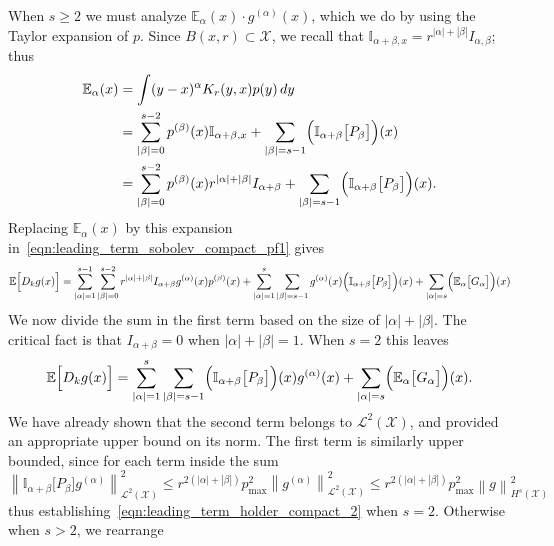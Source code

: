 \documentclass{article}
\newcommand{\abs}[1]{\left \lvert #1 \right \rvert}
\newcommand{\norm}[1]{\left \lVert #1 \right \rVert}
\newcommand{\1}{\mathbf{1}}
\newcommand{\Xset}{\mathcal{X}}
\newcommand{\Leb}{\mathcal{L}}
\newcommand{\Ebb}{\mathbb{E}}
\newcommand{\Ibb}{\mathbb{I}}
\theoremstyle{alden}
\theoremstyle{aldenthm}
\theoremstyle{definition}
\theoremstyle{remark}
\begin{document}
When $s \geq 2$ we must analyze $\Ebb_{\alpha}(x) \cdot g^{(\alpha)}(x)$, which we do by using the Taylor expansion of $p$. Since $B(x,r) \subset \Xset$, we recall that $\Ibb_{\alpha + \beta,x} = r^{\abs{\alpha} + \abs{\beta}}I_{\alpha,\beta}$; thus
\begin{align*}
\Ebb_{\alpha}(x) & = \int(y - x)^{\alpha} K_r(y,x) p(y) \,dy \\
& = \sum_{\abs{\beta} = 0}^{s - 2} p^{(\beta)}(x) \Ibb_{\alpha + \beta,x} + \sum_{\abs{\beta} = s - 1} \Bigl(\Ibb_{\alpha + \beta}\bigl[P_{\beta}\bigr]\Bigr)(x) \\
& = \sum_{\abs{\beta} = 0}^{s - 2} p^{(\beta)}(x) r^{\abs{\alpha} + \abs{\beta}} I_{\alpha + \beta} + \sum_{\abs{\beta} = s - 1} \Bigl(\Ibb_{\alpha + \beta}\bigl[P_{\beta}\bigr]\Bigr)(x).
\end{align*}
Replacing $\Ebb_{\alpha}(x)$ by this expansion in~\eqref{eqn:leading_term_sobolev_compact_pf1} gives
\begin{equation*}
\Ebb\Bigl[D_kg(x)\Bigr] = \sum_{\abs{\alpha} = 1}^{s - 1} \sum_{\abs{\beta} = 0}^{s - 2} r^{\abs{\alpha} + \abs{\beta}} I_{\alpha + \beta} g^{(\alpha)}(x) p^{(\beta)}(x)  + \sum_{\abs{\alpha} = 1}^{s} \sum_{\abs{\beta} = s - 1} g^{(\alpha)}(x) \Bigl( \Ibb_{\alpha + \beta}\bigl[P_{\beta}\bigr]\Bigr)(x)  + \sum_{\abs{\alpha} = s} \Bigl(\Ebb_{\alpha}\bigl[G_{\alpha}\bigr]\Bigr)(x)
\end{equation*}
We now divide the sum in the first term based on the size of $\abs{\alpha} + \abs{\beta}$. The critical fact is that $I_{\alpha + \beta} = 0$ when $\abs{\alpha} + \abs{\beta} = 1$. When $s = 2$ this leaves
\begin{equation*}
\Ebb\Bigl[D_kg(x)\Bigr] = \sum_{\abs{\alpha} = 1}^{s} \sum_{\abs{\beta} = s - 1} \Bigl(\Ibb_{\alpha + \beta}\bigl[P_{\beta}\bigr]\Bigr)(x) g^{(\alpha)}(x) + \sum_{\abs{\alpha} = s} \Bigl(\Ebb_{\alpha}\bigl[G_{\alpha}\bigr]\Bigr)(x).
\end{equation*}
We have already shown that the second term belongs to $\Leb^2(\Xset)$, and provided an appropriate upper bound on its norm. The first term is similarly upper bounded, since for each term inside the sum
\begin{equation*}
\norm{\Ibb_{\alpha + \beta}\bigl[P_{\beta}\bigr]g^{(\alpha)}}_{\Leb^2(\Xset)}^2 \leq r^{2(\abs{\alpha} + \abs{\beta})} p_{\max}^2 \norm{g^{(\alpha)}}_{\Leb^2(\Xset)}^2 \leq r^{2(\abs{\alpha} + \abs{\beta})} p_{\max}^2 \norm{g}_{H^s(\Xset)}^2 \nonumber
\end{equation*}
thus establishing~\eqref{eqn:leading_term_holder_compact_2} when $s = 2$. Otherwise when $s > 2$, we rearrange
\end{document}
